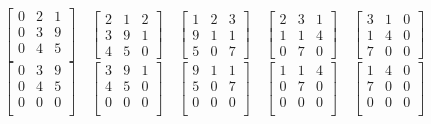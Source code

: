 \documentclass{article}
\begin{document}
\[
	\begin{bmatrix}
		0 & 2 & 1 \\
		0 & 3 & 9 \\
		0 & 4 & 5 \\
	\end{bmatrix}
	\quad
	\begin{bmatrix}
		2 & 1 & 2 \\
		3 & 9 & 1 \\
		4 & 5 & 0
	\end{bmatrix}
	\quad
	\begin{bmatrix}
		1 & 2 & 3 \\
		9 & 1 & 1 \\
		5 & 0 & 7
	\end{bmatrix}
	\quad
	\begin{bmatrix}
		2 & 3 & 1 \\
		1 & 1 & 4 \\
		0 & 7 & 0
	\end{bmatrix}
	\quad
	\begin{bmatrix}
		3 & 1 & 0 \\
		1 & 4 & 0 \\
		7 & 0 & 0
	\end{bmatrix}
\]
\[
	\begin{bmatrix}
		0 & 3 & 9 \\
		0 & 4 & 5 \\
		0 & 0 & 0 \\
	\end{bmatrix}
	\quad
	\begin{bmatrix}
		3 & 9 & 1 \\
		4 & 5 & 0 \\
		0 & 0 & 0 \\
	\end{bmatrix}
	\quad
	\begin{bmatrix}
		9 & 1 & 1 \\
		5 & 0 & 7 \\
		0 & 0 & 0 \\
	\end{bmatrix}
	\quad
	\begin{bmatrix}
		1 & 1 & 4 \\
		0 & 7 & 0 \\
		0 & 0 & 0 \\
	\end{bmatrix}
	\quad
	\begin{bmatrix}
		1 & 4 & 0 \\
		7 & 0 & 0 \\
		0 & 0 & 0 \\
	\end{bmatrix}
\]
\end{document}

